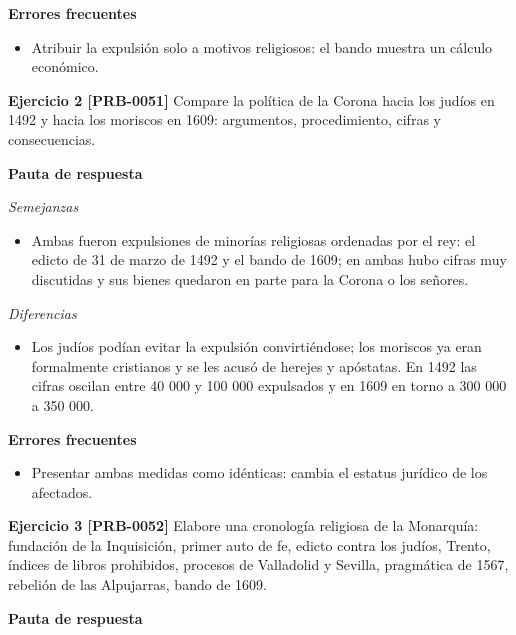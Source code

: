 \documentclass{book}
\begin{document}
\noindent\textbf{Errores frecuentes}
\begin{itemize}
\item Atribuir la expulsión solo a motivos religiosos: el bando muestra un cálculo económico.
\end{itemize}

\noindent\textbf{Ejercicio 2 [PRB-0051]}
Compare la política de la Corona hacia los judíos en 1492 y hacia los moriscos en 1609: argumentos, procedimiento, cifras y consecuencias.


\noindent\textbf{Pauta de respuesta}

\noindent\textit{Semejanzas}
\begin{itemize}
\item Ambas fueron expulsiones de minorías religiosas ordenadas por el rey: el edicto de 31 de marzo de 1492 y el bando de 1609; en ambas hubo cifras muy discutidas y sus bienes quedaron en parte para la Corona o los señores.
\end{itemize}

\noindent\textit{Diferencias}
\begin{itemize}
\item Los judíos podían evitar la expulsión convirtiéndose; los moriscos ya eran formalmente cristianos y se les acusó de herejes y apóstatas. En 1492 las cifras oscilan entre 40 000 y 100 000 expulsados y en 1609 en torno a 300 000 a 350 000.
\end{itemize}

\noindent\textbf{Errores frecuentes}
\begin{itemize}
\item Presentar ambas medidas como idénticas: cambia el estatus jurídico de los afectados.
\end{itemize}

\noindent\textbf{Ejercicio 3 [PRB-0052]}
Elabore una cronología religiosa de la Monarquía: fundación de la Inquisición, primer auto de fe, edicto contra los judíos, Trento, índices de libros prohibidos, procesos de Valladolid y Sevilla, pragmática de 1567, rebelión de las Alpujarras, bando de 1609.


\noindent\textbf{Pauta de respuesta}
\end{document}
